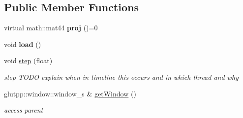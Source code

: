 \subsection*{\-Public \-Member \-Functions}
\begin{DoxyCompactItemize}
\item 
\hypertarget{classglutpp_1_1Camera_1_1Projection_1_1Base_aca0f31b2dd7018b8b4f58189f22b1003}{virtual math\-::mat44 {\bfseries proj} ()=0}\label{classglutpp_1_1Camera_1_1Projection_1_1Base_aca0f31b2dd7018b8b4f58189f22b1003}

\item 
\hypertarget{classglutpp_1_1Camera_1_1Projection_1_1Base_a4d348ea3fc3134598b02d373a8d081d5}{void {\bfseries load} ()}\label{classglutpp_1_1Camera_1_1Projection_1_1Base_a4d348ea3fc3134598b02d373a8d081d5}

\item 
\hypertarget{classglutpp_1_1Camera_1_1Projection_1_1Base_a1e062c9a3aba6edb0fc77941a2297b2e}{void \hyperlink{classglutpp_1_1Camera_1_1Projection_1_1Base_a1e062c9a3aba6edb0fc77941a2297b2e}{step} (float)}\label{classglutpp_1_1Camera_1_1Projection_1_1Base_a1e062c9a3aba6edb0fc77941a2297b2e}

\begin{DoxyCompactList}\small\item\em step \-T\-O\-D\-O explain when in timeline this occurs and in which thread and why \end{DoxyCompactList}\end{DoxyCompactItemize}
{\bf }\par
\begin{DoxyCompactItemize}
\item 
\hypertarget{classglutpp_1_1Camera_1_1Projection_1_1Base_a48be27bb0adf9017c29c6bd58e535f10}{glutpp\-::window\-::window\-\_\-s \& \hyperlink{classglutpp_1_1Camera_1_1Projection_1_1Base_a48be27bb0adf9017c29c6bd58e535f10}{get\-Window} ()}\label{classglutpp_1_1Camera_1_1Projection_1_1Base_a48be27bb0adf9017c29c6bd58e535f10}

\begin{DoxyCompactList}\small\item\em access parent \end{DoxyCompactList}\end{DoxyCompactItemize}

